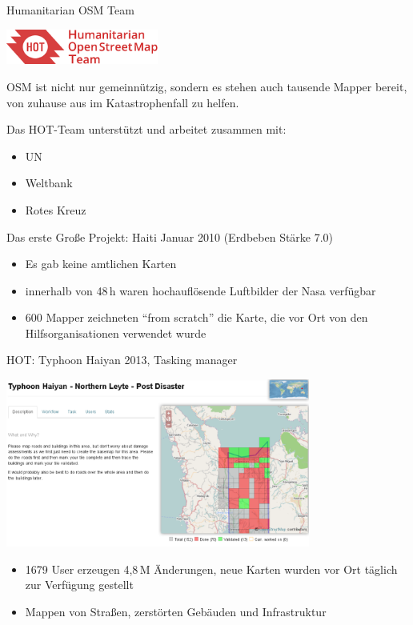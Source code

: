 \documentclass{beamer}
\begin{document}
\begin{frame}{Humanitarian OSM Team}

\vspace{-1.5cm}
\hfill \includegraphics[width=5cm]{hot.png}

OSM ist nicht nur gemeinnützig, sondern es stehen auch tausende Mapper bereit, von zuhause aus im Katastrophenfall zu helfen.
\vspace{0.1cm}

Das HOT-Team unterstützt und arbeitet zusammen mit:

\begin{itemize}
  \item UN
  \item Weltbank
  \item Rotes Kreuz
\end{itemize}

Das erste Große Projekt: Haiti Januar 2010 (Erdbeben Stärke 7.0)

\begin{itemize}
  \item Es gab keine amtlichen Karten
  \item innerhalb von 48\,h waren hochauflösende Luftbilder der Nasa verfügbar
  \item  600 Mapper zeichneten "`from scratch"' die Karte, die vor Ort von den Hilfsorganisationen verwendet wurde
\end{itemize}

\end{frame}

\begin{frame}{HOT: Typhoon Haiyan 2013, Tasking manager}

\includegraphics[width=10cm]{hot-task.png}

\begin{itemize}
  \item 1679 User erzeugen 4,8\,M Änderungen, neue Karten wurden vor Ort täglich zur Verfügung gestellt
  \item Mappen von Straßen, zerstörten Gebäuden und Infrastruktur
\end{itemize}

\end{frame}
\end{document}
